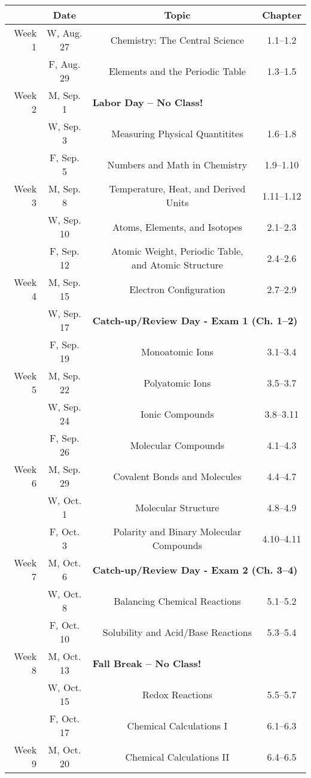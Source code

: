 \begin{tabular}{rcccc}
& Date && Topic & Chapter\\
\midrule
Week 1 & W, Aug. 27&& Chemistry: The Central Science & 1.1--1.2\\
& F, Aug. 29&& Elements and the Periodic Table & 1.3--1.5\\
\midrule
Week 2 & M, Sep. 1& \multicolumn{3}{l}{\textbf{Labor Day -- No Class!}}\\
& W, Sep. 3&& Measuring Physical Quantitites & 1.6--1.8\\
& F, Sep. 5&& Numbers and Math in Chemistry & 1.9--1.10\\
\midrule
Week 3 & M, Sep. 8&& Temperature, Heat, and Derived Units & 1.11--1.12\\
& W, Sep. 10&& Atoms, Elements, and Isotopes & 2.1--2.3\\
& F, Sep. 12&& Atomic Weight, Periodic Table, and Atomic Structure & 2.4--2.6\\
\midrule
Week 4 & M, Sep. 15&& Electron Configuration & 2.7--2.9\\
& W, Sep. 17& \multicolumn{3}{l}{\textbf{Catch-up/Review Day - Exam 1 (Ch. 1--2)}}\\
& F, Sep. 19&& Monoatomic Ions & 3.1--3.4\\
\midrule
Week 5 & M, Sep. 22&& Polyatomic Ions & 3.5--3.7\\
& W, Sep. 24&& Ionic Compounds & 3.8--3.11\\
& F, Sep. 26&& Molecular Compounds & 4.1--4.3\\
\midrule
Week 6 & M, Sep. 29&& Covalent Bonds and Molecules & 4.4--4.7\\
& W, Oct. 1&& Molecular Structure & 4.8--4.9\\
& F, Oct. 3&& Polarity and Binary Molecular Compounds & 4.10--4.11\\
\midrule
Week 7 & M, Oct. 6& \multicolumn{3}{l}{\textbf{Catch-up/Review Day - Exam 2 (Ch. 3--4)}}\\
& W, Oct. 8&& Balancing Chemical Reactions & 5.1--5.2\\
& F, Oct. 10&& Solubility and Acid/Base Reactions & 5.3--5.4\\
\midrule
Week 8 & M, Oct. 13& \multicolumn{3}{l}{\textbf{Fall Break -- No Class!}}\\
& W, Oct. 15&& Redox Reactions & 5.5--5.7\\
& F, Oct. 17&& Chemical Calculations I & 6.1--6.3\\
\midrule
Week 9 & M, Oct. 20&& Chemical Calculations II & 6.4--6.5\\

\end{tabular}
